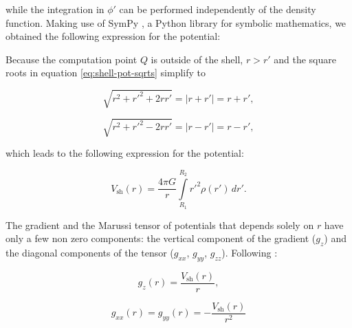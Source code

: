 \documentclass[extra, referee]{gji}
\begin{document}
\noindent
while the integration in $\phi'$ can be performed independently of the density function.
Making use of SymPy \citep{sympy2017}, a Python library for symbolic mathematics, we
obtained the following expression for the potential:


Because the computation point $Q$ is outside of the shell, $r > r'$ and the square roots
in equation \ref{eq:shell-pot-sqrts} simplify to

\begin{equation}
    \sqrt{r^2 + r'^2 + 2rr'} = |r + r'| = r + r',
\end{equation}

\begin{equation}
    \sqrt{r^2 + r'^2 - 2rr'} = |r - r'| = r - r',
\end{equation}

\noindent which leads to the following expression for the potential:

\begin{equation}
    V_\text{sh}(r) = \frac{4\pi G}{r}
    \int\limits_{R_1}^{R_2} {r'}^2 \rho(r') \, dr'.
\label{eq:shell-pot}
\end{equation}

The gradient and the Marussi tensor of potentials that
depends solely on $r$ have only a few non zero components: the vertical
component of the gradient ($g_z$) and the diagonal components of the
tensor ($g_{xx}$, $g_{yy}$, $g_{zz}$).
Following \citet{Grombein2013}:

\begin{equation}
    g_z(r) = \frac{V_\text{sh}(r)}{r},
\end{equation}

\begin{equation}
    g_{xx}(r) = g_{yy}(r) = -\frac{V_\text{sh}(r)}{r^2}
\end{equation}
\end{document}
